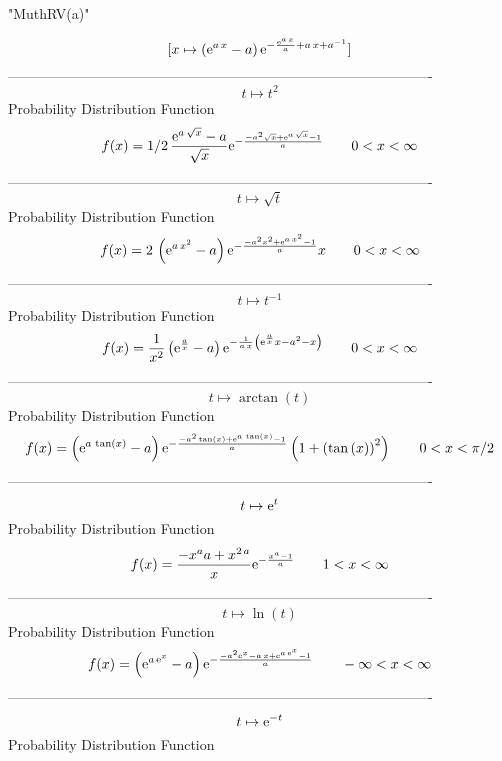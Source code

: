 \documentclass[12pt]{article}
\begin{document}
 
                                 "MuthRV(a)"

$$[x\mapsto  \left( {{\rm e}^{a\,x}}-a \right) {{\rm e}^{-{\frac {{
{\rm e}^{a\,x}}}{a}}+a\,x+{a}^{-1}}}]
$$-------------------------------------------------------------------------------------------  \\$$t\mapsto {t}^{2}
$$Probability Distribution Function 
$$  f(x)=1/2\,{\frac {{{\rm e}^{a\,\sqrt {x}}}-a}{\sqrt {x}}{{\rm e}^{-{\frac {
-{a}^{2}\sqrt {x}+{{\rm e}^{a\,\sqrt {x}}}-1}{a}}}}}
 \qquad0
 < x < \infty 
$$-------------------------------------------------------------------------------------------  \\$$t\mapsto \sqrt {t}
$$Probability Distribution Function 
$$  f(x)=2\, \left( {{\rm e}^{a\,{x}^{2}}}-a \right) {{\rm e}^{-{\frac {-{a}^{2
}{x}^{2}+{{\rm e}^{a\,{x}^{2}}}-1}{a}}}}x
 \qquad0
 < x < \infty 
$$-------------------------------------------------------------------------------------------  \\$$t\mapsto {t}^{-1}
$$Probability Distribution Function 
$$  f(x)={\frac {1}{{x}^{2}} \left( {{\rm e}^{{\frac {a}{x}}}}-a \right) {
{\rm e}^{-{\frac {1}{a\,x} \left( {{\rm e}^{{\frac {a}{x}}}}x-{a}^{2}-
x \right) }}}}
 \qquad0
 < x < \infty 
$$-------------------------------------------------------------------------------------------  \\$$t\mapsto \arctan \left( t \right) 
$$Probability Distribution Function 
$$  f(x)= \left( {{\rm e}^{a\,\tan \left( x \right) }}-a \right) {{\rm e}^{-{
\frac {-{a}^{2}\tan \left( x \right) +{{\rm e}^{a\,\tan \left( x
 \right) }}-1}{a}}}} \left( 1+ \left( \tan \left( x \right)  \right) ^
{2} \right) 
 \qquad0
 < x < \pi/2
$$-------------------------------------------------------------------------------------------  \\$$t\mapsto {{\rm e}^{t}}
$$Probability Distribution Function 
$$  f(x)={\frac {-{x}^{a}a+{x}^{2\,a}}{x}{{\rm e}^{-{\frac {{x}^{a}-1}{a}}}}}
 \qquad1
 < x < \infty 
$$-------------------------------------------------------------------------------------------  \\$$t\mapsto \ln  \left( t \right) 
$$Probability Distribution Function 
$$  f(x)= \left( {{\rm e}^{a\,{{\rm e}^{x}}}}-a \right) {{\rm e}^{-{\frac {-{a}
^{2}{{\rm e}^{x}}-a\,x+{{\rm e}^{a\,{{\rm e}^{x}}}}-1}{a}}}}
 \qquad-\infty 
 < x < \infty 
$$-------------------------------------------------------------------------------------------  \\$$t\mapsto {{\rm e}^{-t}}
$$Probability Distribution Function 
\end{document}
